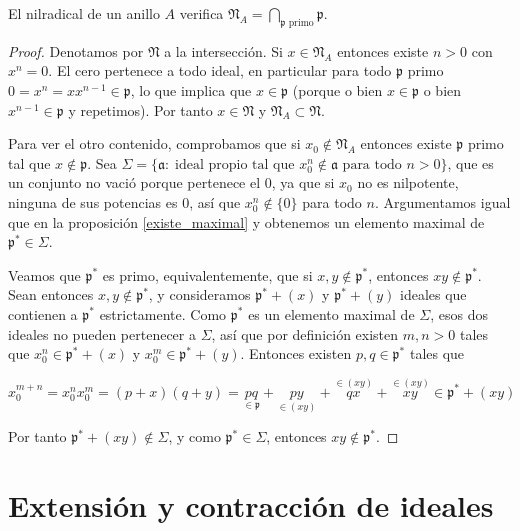 \documentclass[./main.tex]{subfiles}
\begin{document}
\begin{proposition}
El nilradical de un anillo $A$ verifica $\mathfrak N_A = \bigcap_{\mathfrak p \text{ primo}} \mathfrak p$.
\end{proposition}
\begin{proof}
Denotamos por $\mathfrak N$ a la intersección. Si $x\in \mathfrak N_A$ entonces existe $n>0$ con $x^n = 0$. El cero pertenece a todo ideal, en particular para todo $\mathfrak p$ primo $0= x^n = x x^{n-1} \in \mathfrak p$, lo que implica que $x \in \mathfrak p$ (porque o bien $x\in\mathfrak p $ o bien $x^{n-1}\in \mathfrak p$ y repetimos). Por tanto $x\in \mathfrak N$ y $\mathfrak N_A \subset \mathfrak N$.

Para ver el otro contenido, comprobamos que si $x_0 \not \in \mathfrak N_A$ entonces existe $\mathfrak p$ primo tal que $x\not \in \mathfrak p$. Sea $\Sigma = \{\mathfrak a : \; \text{ideal propio tal que } x_0^n \not \in \mathfrak a \text{ para todo } n>0 \}$, que es un conjunto no vació porque pertenece el $0$, ya que si $x_0$ no es nilpotente, ninguna de sus potencias es $0$, así que $x_0^n \not \in \{0\}$ para todo $n$. Argumentamos igual que en la proposición \ref{existe_maximal} y obtenemos un elemento maximal de $\mathfrak p^* \in \Sigma$.

Veamos que $\mathfrak p^*$ es primo, equivalentemente, que si $x, y \not \in \mathfrak p^*$, entonces $xy\not\in \mathfrak p^*$. Sean entonces $x,y \not \in \mathfrak p^*$, y consideramos $\mathfrak p^* + (x)$ y $\mathfrak p^* + (y)$ ideales que contienen a $\mathfrak p^*$ estrictamente. Como $\mathfrak  p^*$ es un elemento maximal de $\Sigma$, esos dos ideales no pueden pertenecer a $\Sigma$, así que por definición existen $m, n>0$ tales que $x_0^n\in \mathfrak p^* + (x)$ y $x_0^m \in \mathfrak p^* + (y)$. Entonces existen $p,q \in \mathfrak p^*$ tales que

\[x_0^{m+n} = x_0^n x_0^m = (p+x)(q+y) = \underset{\in \mathfrak p}{pq} + \underset{\in (xy)}{py} + \overset{\in (xy)}{qx} + \overset{\in (xy)}{xy} \in \mathfrak p^* + (xy) \]

Por tanto $\mathfrak p^*+(xy) \not \in \Sigma$, y como $\mathfrak p^* \in \Sigma $, entonces $xy \not \in \mathfrak p ^*$.
\end{proof}

\section{Extensión y contracción de ideales}
\end{document}
